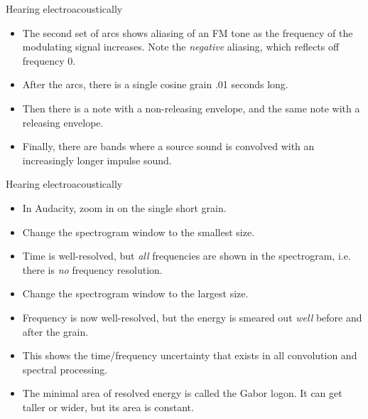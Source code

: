 \documentclass{beamer}
\begin{document}
\begin{frame}{Hearing electroacoustically}
\begin{itemize}
\item The second set of arcs shows aliasing of an FM tone as the frequency of the modulating signal increases. 
Note the \emph{negative} aliasing, which reflects off frequency 0.
\item After the arcs, there is a single cosine grain .01 seconds long.
\item Then there is a note with a non-releasing envelope, and the same note with a releasing envelope.
\item Finally, there are bands where a source sound is convolved with an increasingly longer impulse sound.
\end{itemize}
\end{frame}

\begin{frame}{Hearing electroacoustically}
\begin{itemize}
\item In Audacity, zoom in on the single short grain.
\item Change the spectrogram window to the smallest size.
\item Time is well-resolved, but \emph{all} frequencies are shown in the spectrogram, i.e. there is \emph{no} frequency resolution.
\item Change the spectrogram window to the largest size.
\item Frequency is now well-resolved, but the energy is smeared out \emph{well} before and after the grain.
\item This shows the time/frequency uncertainty that exists in all convolution and spectral processing.
\item The minimal area of resolved energy is called the Gabor logon. It can get taller or wider, but its area is constant.
\end{itemize}
\end{frame}
\end{document}
